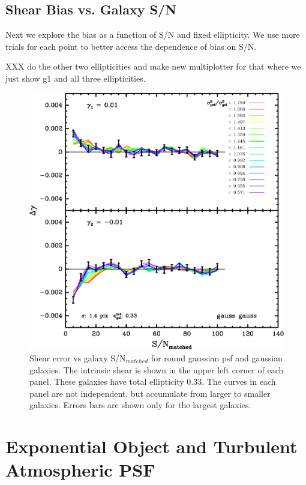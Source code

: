 \documentclass[12pt,preprint]{aastex}
\begin{document}
\subsection{Shear Bias vs. Galaxy S/N}

Next we explore the bias as a function of S/N and fixed ellipticity.    We use
more trials for each point to better access the dependence of bias on S/N.

XXX do the other two ellipticities and make new multiplotter for that
where we just show g1 and all three ellipticities.

\begin{figure}[t] \centering
\includegraphics[scale=0.7]{figures/gmix-fit-gg04r01-yr-0.005-0.005-diff-cum.eps}

 \caption{Shear error vs galaxy S/N$_{matched}$ for round gaussian psf and
 gaussian galaxies. The intrinsic shear is shown in the upper left corner of
 each panel.  These galaxies have total ellipticity 0.33.  The curves in each
 panel are not independent, but accumulate from larger to smaller galaxies.
 Errors bars are shown only for the largest galaxies.
 \label{fig:gg04r01}}

\end{figure}


\section{Exponential Object and Turbulent Atmospheric PSF}
\end{document}
